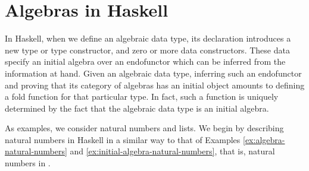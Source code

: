 \section{Algebras in Haskell}
\label{sec:algebras-haskell}

In Haskell, when we define an algebraic data type, its declaration
introduces a new type or type constructor, and zero or more data
constructors. These data specify an initial algebra over an
endofunctor which can be inferred from the information at hand. Given
an algebraic data type, inferring such an endofunctor and proving that
its category of algebras has an initial object amounts to defining a
fold function for that particular type. In fact, such a function is
uniquely determined by the fact that the algebraic data type is an
initial algebra.

As examples, we consider natural numbers and lists. We begin by
describing natural numbers in Haskell in a similar way to that of
Examples \ref{ex:algebra-natural-numbers} and
\ref{ex:initial-algebra-natural-numbers}, that is, natural numbers in
\set.

